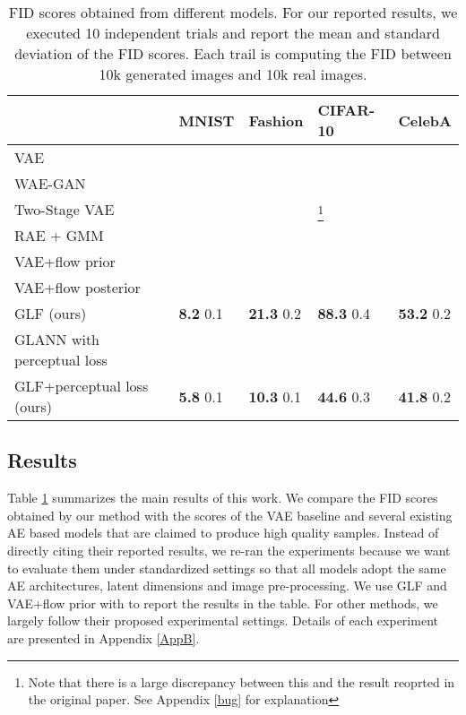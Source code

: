 \documentclass{article}
\begin{document}
\begin{savenotes}
 \begin{table}[ht]
  \caption{FID scores obtained from different models. For our reported results, we executed 10 independent trials and report the mean and standard deviation of the FID scores. Each trail is computing the FID between 10k generated images and 10k real images.}
  \label{FID}
  \centering
  \begin{tabular}{lllll}
    \toprule
        & MNIST  &Fashion   & CIFAR-10 & CelebA \\
    \midrule
	 VAE &  &  &  & \\
	 WAE-GAN  &  &  &  & \\
	 Two-Stage VAE  &  &  & \footnote{Note that there is a large discrepancy between this and the result reoprted in the original paper. See Appendix \ref{bug} for explanation} &  \\
	 RAE + GMM  &  &  &  & \\
VAE+flow prior &  &  &  & \\
	 VAE+flow posterior &  &  &  & \\
	 GLF (ours) & \textbf{8.2}  0.1 & \textbf{21.3}  0.2 & \textbf{88.3}  0.4 & \textbf{53.2}  0.2 \\
	 \midrule
	 GLANN with perceptual loss &  &  &  &  \\
	 GLF+perceptual loss (ours) & \textbf{5.8}  0.1 & \textbf{10.3}  0.1 & \textbf{44.6}  0.3 & \textbf{41.8}  0.2\\
    \bottomrule
  \end{tabular}
\end{table}
\end{savenotes}

\subsection{Results}
Table \ref{FID} summarizes the main results of this work. We compare the FID scores obtained by our method with the scores of the VAE baseline and several existing AE based models that are claimed to produce high quality samples. Instead of directly citing their reported results, we re-ran the experiments because we want to evaluate them under standardized settings so that all models adopt the same AE architectures, latent dimensions and image pre-processing. We use GLF and VAE+flow prior with  to report the results in the table. For other methods, we largely follow their proposed experimental settings. Details of each experiment are presented in Appendix \ref{AppB}.
\end{document}
